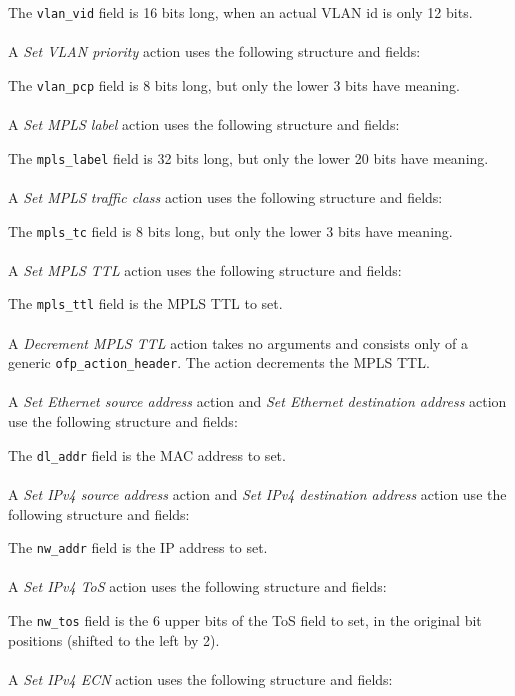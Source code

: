 
The \verb|vlan_vid| field is 16 bits long, when an actual VLAN id is only 12 bits.
\\\\
A \emph{Set VLAN priority} action uses the following structure and fields:


The \verb|vlan_pcp| field is 8 bits long, but only the lower 3 bits have meaning.  
\\\\
A \emph{Set MPLS label} action uses the following structure and fields:


The \verb|mpls_label| field is 32 bits long, but only the lower 20 bits have meaning.
\\\\
A \emph{Set MPLS traffic class} action uses the following structure and fields:


The \verb|mpls_tc| field is 8 bits long, but only the lower 3 bits have meaning.
\\\\
A \emph{Set MPLS TTL} action uses the following structure and fields:


The \verb|mpls_ttl| field is the MPLS TTL to set.
\\\\
A \emph{Decrement MPLS TTL} action takes no arguments and consists only of a generic \verb|ofp_action_header|. The action decrements the MPLS TTL.
\\\\
A \emph{Set Ethernet source address} action and \emph{Set Ethernet destination address} action use the following structure and fields:


The \verb|dl_addr| field is the MAC address to set.
\\\\
A \emph{Set IPv4 source address} action and \emph{Set IPv4 destination address} action use the following structure and fields:


The \verb|nw_addr| field is the IP address to set.
\\\\
A \emph{Set IPv4 ToS} action uses the following structure and fields:


The \verb|nw_tos| field is the 6 upper bits of the ToS field to set, in the original bit positions (shifted to the left by 2).
\\\\
A \emph{Set IPv4 ECN} action uses the following structure and fields:

